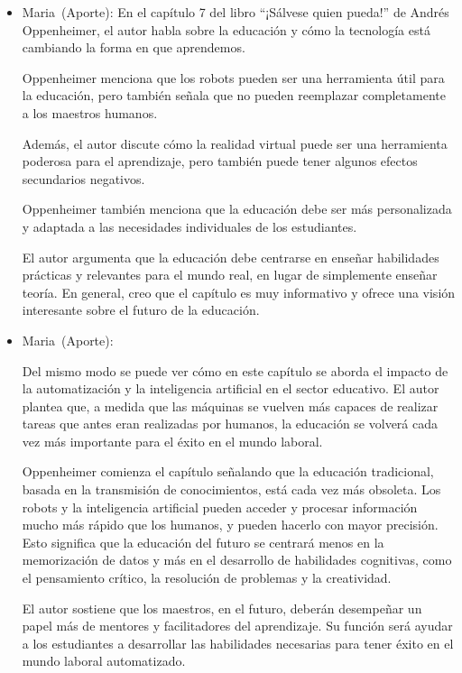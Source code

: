 \documentclass[letterpaper, 12pt]{article}
\newcommand{\memberMaria}{Maria~}
\begin{document}
\begin{itemize}[label=$\triangleright$]
    \item \memberMaria (Aporte):
          En el capítulo 7 del libro ``¡Sálvese quien pueda!'' de Andrés
          Oppenheimer, el autor habla sobre la educación y cómo la
          tecnología está cambiando la forma en que aprendemos.

          Oppenheimer menciona que los robots pueden ser una
          herramienta útil para la educación, pero también señala que
          no pueden reemplazar completamente a los maestros humanos.

          Además, el autor discute cómo la realidad virtual puede ser
          una herramienta poderosa para el aprendizaje, pero también
          puede tener algunos efectos secundarios negativos.

          Oppenheimer también menciona que la educación debe ser más
          personalizada y adaptada a las necesidades individuales de
          los estudiantes.

          El autor argumenta que la educación debe centrarse en
          enseñar habilidades prácticas y relevantes para el mundo
          real, en lugar de simplemente enseñar teoría. En general,
          creo que el capítulo es muy informativo y ofrece una visión
          interesante sobre el futuro de la educación.

    \item \memberMaria (Aporte):

          Del mismo modo se puede ver cómo en este capítulo se aborda
          el impacto de la automatización y la inteligencia
          artificial en el sector educativo. El autor plantea que, a
          medida que las máquinas se vuelven más capaces de realizar
          tareas que antes eran realizadas por humanos, la educación
          se volverá cada vez más importante para el éxito en el
          mundo laboral.

          Oppenheimer comienza el capítulo señalando que la educación
          tradicional, basada en la transmisión de conocimientos,
          está cada vez más obsoleta. Los robots y la inteligencia
          artificial pueden acceder y procesar información mucho más
          rápido que los humanos, y pueden hacerlo con mayor
          precisión. Esto significa que la educación del futuro se
          centrará menos en la memorización de datos y más en el
          desarrollo de habilidades cognitivas, como el pensamiento
          crítico, la resolución de problemas y la creatividad.

          El autor sostiene que los maestros, en el futuro, deberán
          desempeñar un papel más de mentores y facilitadores del
          aprendizaje. Su función será ayudar a los estudiantes a
          desarrollar las habilidades necesarias para tener éxito en
          el mundo laboral automatizado.


\end{itemize}
\end{document}
